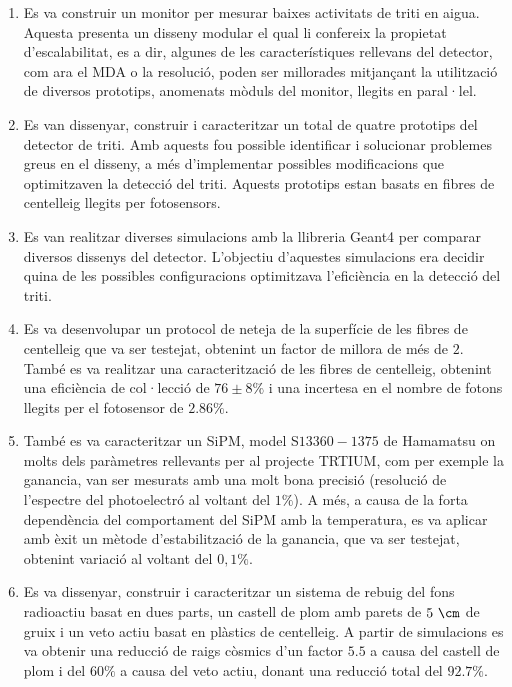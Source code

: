 \begin{enumerate}

\item{} Es va construir un monitor per mesurar baixes activitats de triti en aigua. Aquesta presenta un disseny modular el qual li confereix la propietat d'escalabilitat, es a dir, algunes de les característiques rellevans del detector, com ara el MDA o la resolució, poden ser millorades mitjançant la utilització de diversos prototips, anomenats mòduls del monitor, llegits en paral·lel.

\item{} Es van dissenyar, construir i caracteritzar un total de quatre prototips del detector de triti. Amb aquests fou possible identificar i solucionar problemes greus en el disseny, a més d'implementar possibles modificacions que optimitzaven la detecció del triti. Aquests prototips estan basats en fibres de centelleig llegits per fotosensors.

\item{} Es van realitzar diverses simulacions amb la llibreria Geant4 per comparar diversos dissenys del detector. L'objectiu d'aquestes simulacions era decidir quina de les possibles configuracions optimitzava l'eficiència en la detecció del triti.

\item{} Es va desenvolupar un protocol de neteja de la superfície de les fibres de centelleig que va ser testejat, obtenint un factor de millora de més de $2$. També es va realitzar una caracterització de les fibres de centelleig, obtenint una eficiència de col·lecció de $76 \pm 8\%$ i una incertesa en el nombre de fotons llegits per el fotosensor de $2.86\%$.

\item{} També es va caracteritzar un SiPM, model S$13360-1375$ de Hamamatsu on molts dels paràmetres rellevants per al projecte TRTIUM, com per exemple la ganancia, van ser mesurats amb una molt bona precisió (resolució de l'espectre del photoelectró al voltant del $1\%$). A més, a causa de la forta dependència del comportament del SiPM amb la temperatura, es va aplicar amb èxit un mètode d'estabilització de la ganancia, que va ser testejat, obtenint variació al voltant del $0,1\%$.

\item{} Es va dissenyar, construir i caracteritzar un sistema de rebuig del fons radioactiu basat en dues parts, un castell de plom amb parets de $5~\cm$ de gruix i un veto actiu basat en plàstics de centelleig. A partir de simulacions es va obtenir una reducció de raigs còsmics d'un factor $5.5$ a causa del castell de plom i del $60\%$ a causa del veto actiu, donant una reducció total del $92.7\%$.


\end{enumerate}
